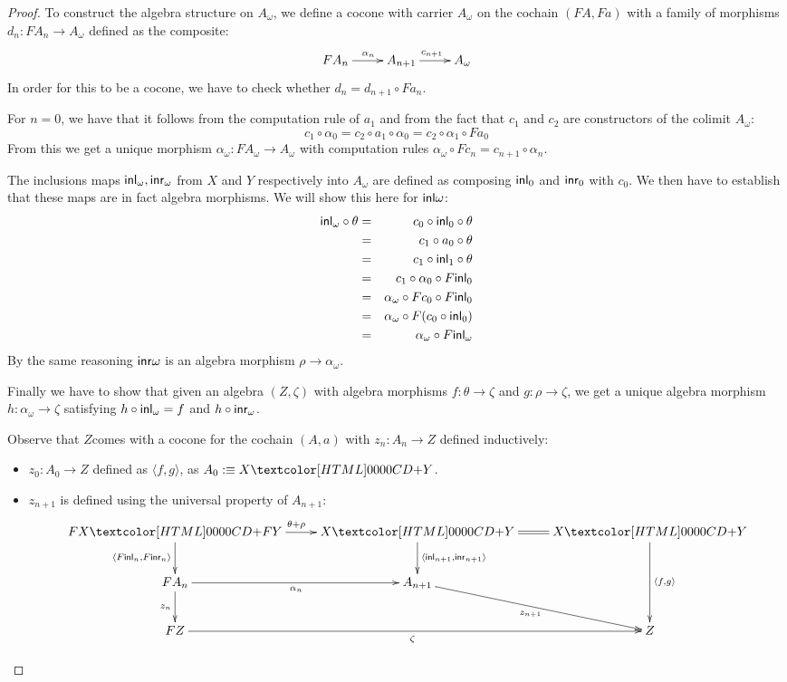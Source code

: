 \begin{proof}
  To construct the algebra structure on $A_{\omega}$, we define a
  cocone with carrier $A_{\omega}$ on the cochain $(FA, Fa)$ with a
  family of morphisms $d_n : FA_n \to A_{\omega}$ defined as the
  composite:
  $$
  \xymatrix{
    FA_n \ar[r]^{\alpha_n}
    &A_{n+1}
    \ar[r]^{c_{n+1}}
    &A_{\omega}
  }
  $$
  In order for this to be a cocone, we have to check whether
  $d_n = d_{n+1} \circ F a_n$.

  For $n = 0$, we have that it follows from the computation rule of
  $a_1$ and from the fact that $c_1$ and $c_2$ are constructors of the
  colimit $A_{\omega}$:
  $$
  c_1 \circ \alpha_0 = c_2 \circ a_1 \circ \alpha_0 = c_2 \circ \alpha_1 \circ Fa_0
  $$
  From this we get a unique morphism
  $\alpha_{\omega} : FA_{\omega} \to A_{\omega}$ with computation
  rules $\alpha_{\omega} \circ Fc_n = c_{n+1} \circ \alpha_n$.

  The inclusions maps $\inln{\omega}, \inrn{\omega}$ from $X$ and $Y$
  respectively into $A_{\omega}$ are defined as composing $\inln{0}$
  and $\inrn{0}$ with $c_0$. We then have to establish that these maps
  are in fact algebra morphisms. We will show this here for
  $\inl{\omega}$:
  \begin{align*}
    \inln{\omega} \circ \theta &=& c_0 \circ \inln{0} \circ \theta \\
    &=& c_1 \circ a_0 \circ \theta \\
    &=& c_1 \circ \inln{1} \circ \theta \\
    &=& c_1 \circ \alpha_0 \circ F \inln{0} \\
    &=&\alpha_{\omega} \circ F c_0 \circ F \inln{0} \\
    &=&\alpha_{\omega} \circ F (c_0 \circ \inln{0}) \\
    &=&\alpha_{\omega} \circ F \inln{\omega}
  \end{align*}
  By the same reasoning $\inr{\omega}$ is an algebra morphism
  $\rho \to \alpha_{\omega}$.

  Finally we have to show that given an algebra $(Z,\zeta)$ with
  algebra morphisms $f : \theta \to \zeta$ and $g : \rho \to \zeta$,
  we get a unique algebra morphism $h : \alpha_{\omega} \to \zeta$
  satisfying $h \circ \inln{\omega} = f$ and $h \circ \inrn{\omega}$.

  Observe that $Z$comes with a cocone for the cochain $(A,a)$ with
  $z_n : A_n \to Z$ defined inductively:
  \begin{itemize}
  \item $z_0  : A_0 \to Z$ defined as $\langle f , g \rangle$, as $A_0 \ddefeq \coproduct{X}{Y}$.
  \item $z_{n+1}$ is defined using the universal property of
    $A_{n+1}$:
    $$
    \xymatrix{
      \coproduct{FX}{FY} \ar[r]^{\theta + \rho} \ar[d]_{\langle F \inln{n} , F \inrn{n} \rangle} 
      &\coproduct{X}{Y} \ar[d]^{\langle \inln{n+1} , \inrn{n+1} \rangle} \ar@{=}[r]
      &\coproduct{X}{Y} \ar[dd]^{\langle f , g \rangle} \\
      FA_n \ar[r]_{\alpha_n} \ar[d]_{z_n}
      &A_{n+1} \ar[dr]_{z_{n+1}}
      \\
      FZ \ar[rr]_{\zeta}
      &&Z
    }
    $$
  \end{itemize}


\end{proof}
